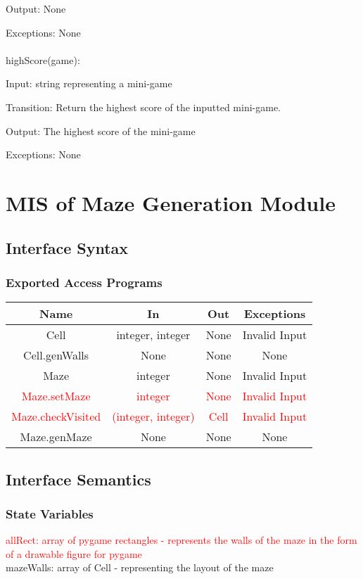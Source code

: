 \documentclass[12pt, titlepage]{article}
\begin{document}
		Output: None
		
		Exceptions: None\\
		\\
		highScore(game):
		
		Input: string representing a mini-game
		
		Transition: Return the highest score of the inputted mini-game.
		
		Output: The highest score of the mini-game
		
		Exceptions: None
	
	
	
\section{MIS of Maze Generation Module}
		\subsection{Interface Syntax}
		\subsubsection{Exported Access Programs}
		\begin{tabular}[pos]{|c|c|c|c|}
			\hline
			\textbf{Name}& \textbf{In} & \textbf{Out} & \textbf{Exceptions} \\ \hline
			Cell & integer, integer & None & Invalid Input \\ \hline
			Cell.genWalls & None & None & None \\ \hline
			Maze & integer & None & Invalid Input \\ \hline
			\textcolor{red}{Maze.setMaze} & \textcolor{red}{integer} & \textcolor{red}{None} & \textcolor{red}{Invalid Input} \\ \hline
			\textcolor{red}{Maze.checkVisited} & \textcolor{red}{(integer, integer)} & \textcolor{red}{Cell} & \textcolor{red}{Invalid Input} \\ \hline
			Maze.genMaze & None & None & None \\ \hline
		\end{tabular}
		
		\subsection{Interface Semantics}
		\subsubsection{State Variables}
		\textcolor{red}{allRect: array of pygame rectangles - represents the walls of the maze in the form of a drawable figure for pygame} \\
		mazeWalls: array of Cell - representing the layout of the maze
		
\end{document}

